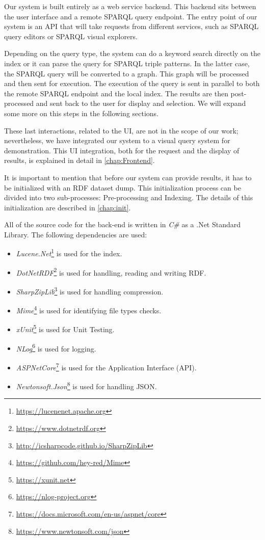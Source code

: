 Our system is built entirely as a web service backend. 
This backend sits between the user interface and a remote SPARQL query endpoint. 
The entry point of our system is an API that will take requests from different services, such as SPARQL query editors or SPARQL visual explorers. 

Depending on the query type, the system can do a keyword search directly on the index or it can parse the query for SPARQL triple patterns. 
In the latter case, the SPARQL query will be converted to a graph. 
This graph will be processed and then sent for execution. 
The execution of the query is sent in parallel to both the remote SPARQL endpoint and the local index. 
The results are then post-processed and sent back to the user for display and selection. 
We will expand some more on this steps in the following sections.

These last interactions, related to the UI, are not in the scope of our work; nevertheless, we have integrated our system to a visual query system for demonstration. 
This UI integration, both for the request and the display of results, is explained in detail in \autoref{chap:Frontend}.

It is important to mention that before our system can provide results, it has to be initialized with an RDF dataset dump. 
This initialization process can be divided into two sub-processes: 
Pre-processing and Indexing. 
The details of this initialization are described in \autoref{chap:init}. 

All of the source code for the back-end is written in \textit{C\#} as a .Net Standard Library. 
The following dependencies are used:

\begin{itemize}
    \item \textit{Lucene.Net}\footnote{\url{https://lucenenet.apache.org}} is used for the index. 
    \item \textit{DotNetRDF}\footnote{\url{https://www.dotnetrdf.org}} is used for handling, reading and writing RDF.
    \item \textit{SharpZipLib}\footnote{\url{http://icsharpcode.github.io/SharpZipLib}} is used for handling compression.
    \item \textit{Mime}\footnote{\url{https://github.com/hey-red/Mime}} is used for identifying file types checks.
    \item \textit{xUnit}\footnote{\url{https://xunit.net}} is used for Unit Testing.
    \item \textit{NLog}\footnote{\url{https://nlog-project.org}} is used for logging.
    \item \textit{ASPNetCore}\footnote{\url{https://docs.microsoft.com/en-us/aspnet/core}} is used for the Application Interface (API).
    \item \textit{Newtonsoft.Json}\footnote{\url{https://www.newtonsoft.com/json}} is used for handling JSON.
\end{itemize}

